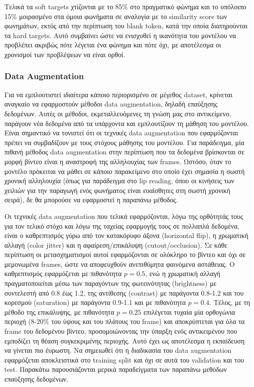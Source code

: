 Τελικά τα soft targets χτίζονται με το 85\% στο πραγματικό φώνημα και το υπόλοιπο 15\% μοιρασμένο στα όμοια φωνήματα σε αναλογία με το similarity score των φωνημάτων, εκτός από την περίπτωση του blank token, κατά την οποία διατηρούνται τα hard targets. Αυτό συμβαίνει ώστε να ενισχυθεί η ικανότητα του μοντέλου να προβλέπει ακριβώς πότε λέγεται ένα φώνημα και πότε όχι, με αποτέλεσμα οι χρονισμοί των προβλέψεων να είναι ορθοί.

\subsubsection{Data Augmentation}

Για να εμπλουτιστεί ιδιαίτερα κάποιο περιορισμένο σε μέγεθος dataset, κρίνεται αναγκαίο να εφαρμοστούν μέθοδοι data augmentation, δηλαδή επαύξησης δεδομένων. Αυτές οι μέθοδοι, εκμεταλλευόμενες τη γνώση μας στο αντικείμενο, παράγουν νέα δεδομένα από τα υπάρχοντα και εμπλουτίζουν τη μάθηση του μοντέλου. Είναι σημαντικό να τονιστεί ότι οι τεχνικές data augmentation που εφαρμόζονται πρέπει να συμβαδίζουν με τους στόχους μάθησης του μοντέλου. Για παράδειγμα, μία πιθανή μέθοδος data augmentation στην περίπτωση που τα δεδομένα βρίσκονται σε μορφή βίντεο είναι η αναστροφή της αλληλουχίας των frames. Ωστόσο, όταν το μοντέλο πρόκειται να μάθει σε κάποιο παρακείμενο στο οποίο έχει σημασία η σωστή χρονική αλληλουχία (όπως για παράδειγμα στο lip reading, όπου οι κινήσεις των χειλιών για την παραγωγή ενός φωνήματος είναι ευαίσθητες στη σωστή χρονική σειρά), δε θα μπορούσε να εφαρμοστεί η παραπάνω μέθοδος.

Οι τεχνικές data augmentation που τελικά εφαρμόζονται, λόγω της ορθότητάς τους για τον τελικό στόχο και λόγω της ταχείας εφαρμογής τους σε πολλαπλά δεδομένα, είναι ο καθρεπτισμός γύρω από τον κατακόρυφο άξονα (horizontal flip), η χρωματική αλλαγή (color jitter) και η αφαίρεση/επικάλυψη (cutout/occlusion). Σε κάθε περίπτωση οι μετασχηματισμοί αυτοί εφαρμόζονται σε ολόκληρο το βίντεο και όχι σε μεμονωμένα frames, ώστε να αποφευχθούν ανεπιθύμητα φαινόμενα αστάθειας. Ο καθρεπτισμός εφαρμόζεται με πιθανότητα $p=0.5$, ενώ η χρωματική αλλαγή πραγματοποιείται μέσω των παραγόντων της φωτεινότητας (brightness) με συντελεστή από 0.8 έως 1.2, της αντίθεσης (contrast) με παράγοντα 0.8-1.2 και του κορεσμού (saturation) με παράγοντα 0.9-1.1 και με πιθανότητα $p=0.4$. Τέλος, με τη μέθοδο της επικάλυψης, με πιθανότητα $p=0.25$ επιλέγεται τυχαία μία ορθογώνια περιοχή (8-20\% του ύψους και του πλάτους του frame) και αποκρύπτεται για όλα τα frame του δεδομένου βίντεο, προσομοιώνοντας την ύπαρξη ενός αντικειμένου που εμποδίζει τη θέαση συγκεκριμένης περιοχής. Αυτό έχει ως αποτέλεσμα η εκπαίδευση να γίνεται πιο έυρωστη. Να σημειωθεί ότι η διαδικασία του data augmentation εφαρμόζεται αποκλειστικά στο training split και όχι σε αυτά του validation και του test. Παρακάτω παρουσιάζονται μερικά παραδείγματα των παραπάνω μεθόδων επαύξησης δεδομένων.

